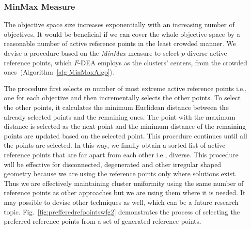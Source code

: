 \documentclass[review]{elsarticle}
\begin{document}
\subsubsection{MinMax Measure}
\label{subsubsec:minMax}

The objective space size increases exponentially with an increasing number of objectives. It would be beneficial if we can cover 
the whole objective space by a reasonable number of active reference points in the least crowded manner. We devise a  procedure based on the \textit{MinMax} measure to select $p$ diverse active reference points, which $F$-DEA employs as the clusters' centers,  from the crowded ones~(Algorithm~\ref{alg:MinMaxAlgo}). 

The  procedure first selects  $m$ number of  most extreme active reference points i.e., one for each objective and then incrementally selects the other points. 
To select the other points,  it calculates the minimum Euclidean distance between the already selected points and the remaining  ones. The point with the maximum distance is selected as the next point and the minimum distance of the remaining points are updated based on the selected point. This procedure continues until all the points are selected.
In this way, we finally obtain a sorted list of active reference points
that are far apart from each other i.e., diverse. 
This procedure will be effective for disconnected, degenerated and other irregular shaped geometry because we are using the reference points only where solutions exist. Thus we are effectively maintaining cluster uniformity using the same number of reference points as other approaches but we are using them where it is needed.
It may possible to devise other techniques as well, which can be a future research topic. %
Fig.~\ref{fig:prefferedrefpointswfg2} demonstrates the process of selecting
the preferred reference points from a set of generated reference points.

 
\end{document}

